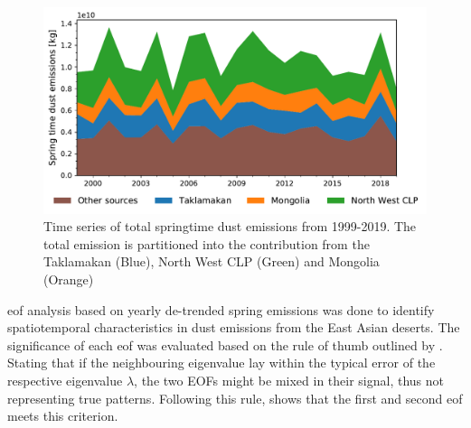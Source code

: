 \begin{figure}[htbp]
    \centering
    \includegraphics[width=\textwidth]{texfiles/figs/emission_timeseries_1999_2019.pdf}
    \caption{Time series of total springtime dust emissions from 1999-2019. The total emission is partitioned into the contribution from the Taklamakan (Blue), North West CLP (Green) and Mongolia (Orange) }
    \label{fig:emission_timeseries}
\end{figure}

\acrfull{eof} analysis based on yearly de-trended spring emissions was done to identify spatiotemporal characteristics in dust emissions from the East Asian deserts.
The significance of each \acrshort{eof} was evaluated based on the rule of thumb outlined by \textcite{north1982sampling}. 
Stating that if the neighbouring eigenvalue lay within the typical error of the respective eigenvalue $\lambda$, the two EOFs might be mixed in their signal, thus not representing true patterns. Following this rule, 
 shows that the first and second \acrshort{eof} meets this criterion.  

